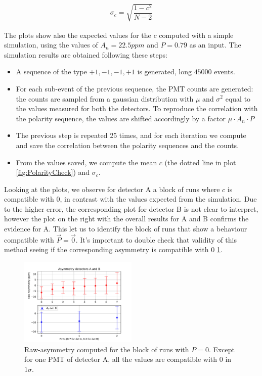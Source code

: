 \begin{align*}
\sigma_{c} = \sqrt{\dfrac{1 - c^{2}}{N - 2}}
\end{align*} 

The plots show also the expected values for the $c$ computed with a simple simulation, using the values of $A_{n} = 22.5 ppm$ and $P = 0.79$ as an input. The simulation results are obtained following these steps:

\begin{itemize}
\item A sequence of the type $+1,-1,-1,+1$ is generated, long $45000$ events.
\item For each sub-event of the previous sequence, the PMT counts are generated: the counts are sampled from a gaussian distribution with $\mu$ and $\sigma^{2}$ equal to the values measured for both the detectors. To reproduce the correlation with the polarity sequence, the values are shifted accordingly  by a factor $\mu \cdot A_{n} \cdot P$  
\item The previous step is repeated 25 times, and for each iteration we compute and save the correlation between the polarity sequences and the counts.
\item From the values saved, we compute the mean $c$ (the dotted line in plot \ref{fig:PolarityCheck}) and $\sigma_{c}$.
\end{itemize}

Looking at the plots, we observe for detector A a block of runs where $c$ is compatible with 0, in contrast with the values expected from the simulation. Due to the higher error, the corresponding plot for detector B is not clear to interpret, however the plot on the right with the overall results for A and B confirms the evidence for A.
This let us to identify the block of runs that show a behaviour compatible with $\vec{P} = \vec{0}$. It's important to double check that validity of this method seeing if the corresponding asymmetry is compatible with $0$ \ref{fig:ZeroAsym}.

\begin{figure}[hbtp]
\centering
\includegraphics[width= 0.5\textwidth]{Analysis/Dataselection/Nopolarity.pdf}
\caption{Raw-asymmetry computed for the block of runs with $P = 0$. Except for one PMT of detector A, all the values are compatible with $0$ in $1\sigma$.}
\label{fig:ZeroAsym}
\end{figure}

